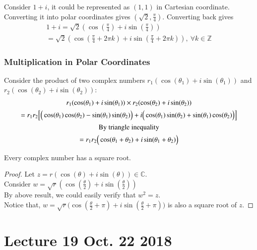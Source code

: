 \documentclass[11pt]{article}
\begin{document}
		\begin{example}
			Consider $1+i$, it could be represented as $(1,1)$ in Cartesian coordinate. Converting it into polar coordinates gives $(\sqrt{2}, \frac{\pi}{4})$. Converting back gives
			\begin{gather*}
				1 + i = \sqrt{2}(\cos(\frac{\pi}{4}) + i \sin(\frac{\pi}{4})) \\
				= \sqrt{2} (\cos(\frac{\pi}{4} + 2\pi k) + i \sin(\frac{\pi}{4} + 2 \pi k)),\ \forall k \in \mathbb{Z}
			\end{gather*}
		\end{example}
		
		\subsubsection{Multiplication in Polar Coordinates}
		\par Consider the product of two complex numbers $r_1 (\cos(\theta_1) + i \sin(\theta_1))$ and $r_2 (\cos(\theta_2) + i \sin(\theta_2))$:
		\begin{gather*}
			r_1 (\cos(\theta_1) + i \sin(\theta_1)) \times r_2 (\cos(\theta_2) + i \sin(\theta_2)) \\
			= r_1 r_2 \Big[
				\Big(\cos(\theta_1) \cos(\theta_2)
				 - \sin(\theta_1) \sin(\theta_2) \Big) + 
				 i \Big(
				 	\cos(\theta_1)\sin(\theta_2) + \sin(\theta_1) \cos(\theta_2)
				 \Big)
				\Big] \\
			\text{{By triangle inequality}} \\
			= r_1 r_2 \Big ( \cos(\theta_1 + \theta_2) + i \sin(\theta_1 + \theta_2)\Big)
		\end{gather*}
		
		\begin{example}
			Every complex number has a square root.
			\begin{proof}
				Let $z = r(\cos(\theta) + i \sin(\theta)) \in \mathbb{C}$. \\
				Consider $w = \sqrt{r} (\cos(\frac{\theta}{2}) + i \sin(\frac{\theta}{2}))$ \\
				By above result, we could easily verify that $w^2 = z$. \\
				Notice that, $w = \sqrt{r}\Big(\cos(\frac{\theta}{2} + \pi) + i \sin(\frac{\theta}{2} + \pi) \Big)$ is also a square root of $z$.
			\end{proof}
		\end{example}
	
	\section{Lecture 19 Oct. 22 2018}
\end{document}
